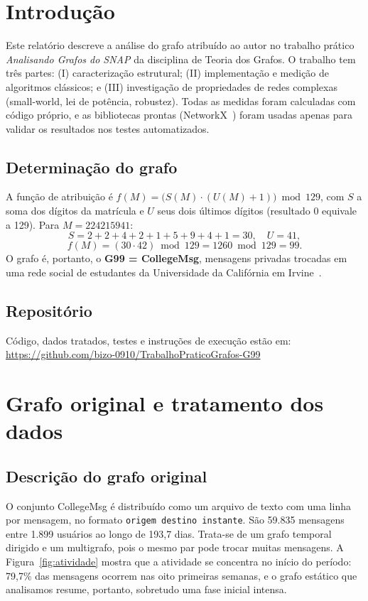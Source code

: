 \documentclass[sigconf]{webmedia}
\newcommand{\nNos}{1.899}
\newcommand{\nMensagens}{59.835}
\newcommand{\nDias}{193{,}7}
\newcommand{\primeirasOitoSem}{79{,}7\%}
\begin{document}
\section{Introdução}
Este relatório descreve a análise do grafo atribuído ao autor no trabalho prático \emph{Analisando Grafos do SNAP} da disciplina de Teoria dos Grafos. O trabalho tem três partes: (I) caracterização estrutural; (II) implementação e medição de algoritmos clássicos; e (III) investigação de propriedades de redes complexas (small-world, lei de potência, robustez). Todas as medidas foram calculadas com código próprio, e as bibliotecas prontas (NetworkX~\cite{hagberg2008}) foram usadas apenas para validar os resultados nos testes automatizados.

\subsection*{Determinação do grafo}
A função de atribuição é $f(M) = \big(S(M)\cdot(U(M)+1)\big) \bmod 129$, com $S$ a soma dos dígitos da matrícula e $U$ seus dois últimos dígitos (resultado 0 equivale a 129). Para $M = 224215941$:
\begin{equation}
  S = 2+2+4+2+1+5+9+4+1 = 30, \quad U = 41,
\end{equation}
\begin{equation}
  f(M) = (30\cdot 42) \bmod 129 = 1260 \bmod 129 = 99.
\end{equation}
O grafo é, portanto, o \textbf{G99 = CollegeMsg}, mensagens privadas trocadas em uma rede social de estudantes da Universidade da Califórnia em Irvine~\cite{panzarasa2009,snap}.

\subsection*{Repositório}
Código, dados tratados, testes e instruções de execução estão em: \url{https://github.com/bizo-0910/TrabalhoPraticoGrafos-G99}

\FloatBarrier
\section{Grafo original e tratamento dos dados}
\subsection{Descrição do grafo original}
O conjunto CollegeMsg é distribuído como um arquivo de texto com uma linha por mensagem, no formato \texttt{origem destino instante}. São \nMensagens{} mensagens entre \nNos{} usuários ao longo de \nDias{} dias. Trata-se de um grafo temporal dirigido e um multigrafo, pois o mesmo par pode trocar muitas mensagens. A Figura~\ref{fig:atividade} mostra que a atividade se concentra no início do período: \primeirasOitoSem{} das mensagens ocorrem nas oito primeiras semanas, e o grafo estático que analisamos resume, portanto, sobretudo uma fase inicial intensa.
\end{document}
